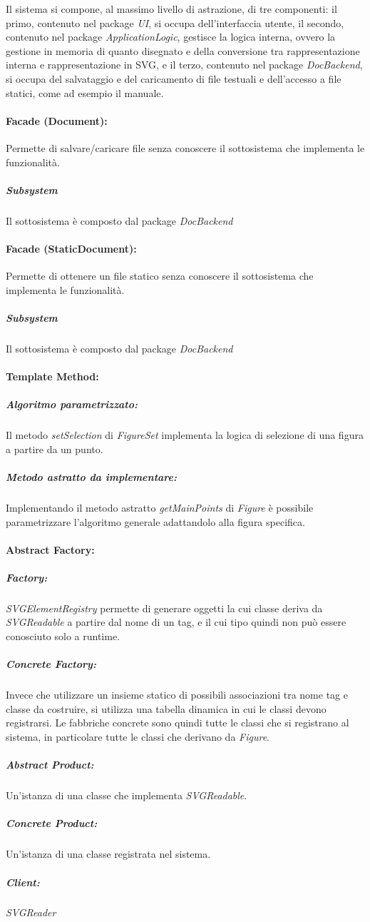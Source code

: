 Il sistema si compone, al massimo livello di astrazione, di tre componenti: il primo, contenuto nel package \textit{UI}, si occupa dell'interfaccia utente, il secondo, contenuto nel package \textit{ApplicationLogic}, gestisce la logica interna, ovvero la gestione in memoria di quanto disegnato e della conversione tra rappresentazione interna e rappresentazione in SVG, e il terzo, contenuto nel package \textit{DocBackend}, si occupa del salvataggio e del caricamento di file testuali e dell'accesso a file statici, come ad esempio il manuale.
\paragraph{Facade (Document):}
Permette di salvare/caricare file senza conoscere il sottosistema che implementa le funzionalit\`a.
\subparagraph{Subsystem} Il sottosistema \`e composto dal package \textit{DocBackend}

\paragraph{Facade (StaticDocument):}
Permette di ottenere un file statico senza conoscere il sottosistema che implementa le funzionalit\`a.
\subparagraph{Subsystem} Il sottosistema \`e composto dal package \textit{DocBackend}

\paragraph{Template Method:}
\subparagraph{Algoritmo parametrizzato:}
Il metodo \textit{setSelection} di \textit{FigureSet} implementa la logica di selezione di una figura a partire da un punto.
\subparagraph{Metodo astratto da implementare:}
Implementando il metodo astratto \textit{getMainPoints} di \textit{Figure} \`e possibile parametrizzare l'algoritmo generale adattandolo alla figura specifica.

\paragraph{Abstract Factory:}
\subparagraph{Factory:} \textit{SVGElementRegistry} permette di generare oggetti la cui classe deriva da \textit{SVGReadable} a partire dal nome di un tag, e il cui tipo quindi non pu\`o essere conosciuto solo a runtime.
\subparagraph{Concrete Factory:} Invece che utilizzare un insieme statico di possibili associazioni tra nome tag e classe da costruire, si utilizza una tabella dinamica in cui le classi devono registrarsi. Le fabbriche concrete sono quindi tutte le classi che si registrano al sistema, in particolare tutte le classi che derivano da \textit{Figure}.
\subparagraph{Abstract Product:} Un'istanza di una classe che implementa \textit{SVGReadable}.
\subparagraph{Concrete Product:} Un'istanza di una classe registrata nel sistema.
\subparagraph{Client:} \textit{SVGReader}

